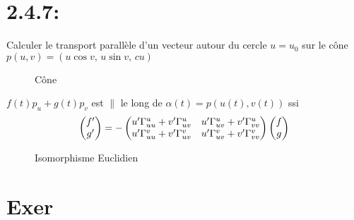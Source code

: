 



\section*{2.4.7:} Calculer le transport parallèle d'un vecteur autour du cercle $u=u_0$ sur le cône $p(u,v) = \left( u\cos v,\, u\sin v,\, cu \right) $  

\begin{figure}[ht]
    \centering
    \caption{Cône}
    \label{fig:cône}
\end{figure}

\begin{tcolorbox}[title=Rappel]
	$f(t) p_u + g(t) p_v$ est $\|$ le long de $\alpha(t) = p(u(t),v(t))$ ssi
	$$\begin{pmatrix} f'\\ g' \end{pmatrix} = - \begin{pmatrix} u'\Gamma_{uu}^{u}+ v'\Gamma_{uv}^{u}& u'\Gamma_{uv}^{u} + v'\Gamma_{vv}^{u}\\u'\Gamma_{uu}^{v}+ v'\Gamma_{uv}^{v}& u'\Gamma_{uv}^{v}+ v'\Gamma_{vv}^v \end{pmatrix}\begin{pmatrix} f\\g \end{pmatrix}$$ 
\end{tcolorbox}




\begin{figure}[ht]
    \centering
    \caption{Isomorphisme Euclidien}
    \label{fig:isomorphisme-euclidien}
\end{figure}


\section*{Exer}




